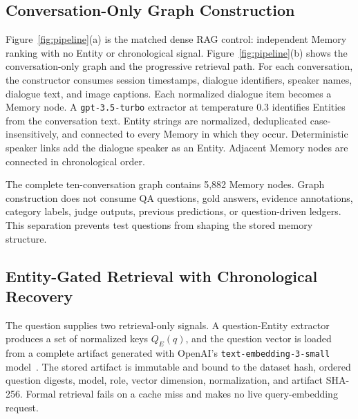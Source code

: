 \documentclass[a4paper,twoside]{article}
\begin{document}
\subsection{Conversation-Only Graph Construction}

Figure~\ref{fig:pipeline}(a) is the matched dense RAG control: independent
Memory ranking with no Entity or chronological signal.
Figure~\ref{fig:pipeline}(b) shows the conversation-only graph and the
progressive retrieval path. For each
conversation, the constructor consumes session timestamps, dialogue
identifiers, speaker names, dialogue text, and image captions. Each normalized
dialogue item becomes a Memory node. A \texttt{gpt-3.5-turbo} extractor at
temperature 0.3 identifies Entities from the conversation text. Entity strings
are normalized, deduplicated case-insensitively, and connected to every Memory
in which they occur. Deterministic speaker links add the dialogue speaker as an
Entity. Adjacent Memory nodes are connected in chronological order.

The complete ten-conversation graph contains 5,882 Memory nodes. Graph
construction does not consume QA questions, gold answers, evidence
annotations, category labels, judge outputs, previous predictions, or
question-driven ledgers. This separation prevents test questions from shaping
the stored memory structure.

\subsection{Entity-Gated Retrieval with Chronological Recovery}

The question supplies two retrieval-only signals. A question-Entity extractor
produces a set of normalized keys \(Q_E(q)\), and the question vector is loaded
from a complete artifact generated with OpenAI's
\texttt{text-embedding-3-small} model~\cite{openaiTextEmbedding3Small}. The
stored artifact is immutable and bound to the dataset hash, ordered question
digests, model, role, vector dimension, normalization, and artifact SHA-256.
Formal retrieval fails on a cache miss and makes no live query-embedding
request.
\end{document}
